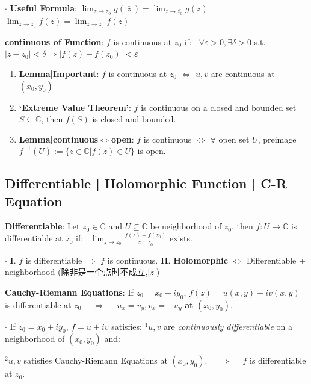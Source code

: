 \documentclass[9pt]{article}
\begin{document}
$\cdot$ \textbf{Useful Formula}: $\lim_{z\to z_0}g(\ \overline{z} \ )=\lim_{z\to\overline{z_0}}g(z)$ \qquad $\lim_{z\to z_0}\overline{f(z)}=\overline{\lim_{z\to z_0}f(z)}$

\textbf{continuous of Function}: $f$ is continuous at $z_0$ if: \ $\forall\varepsilon>0,\exists\delta>0$ s.t. $|z-z_0|<\delta\Rightarrow |f(z)-f(z_0)|<\varepsilon$ 

\begin{enumerate}[itemsep=-2pt, topsep=-2pt]
    \item \textbf{Lemma|Important}: $f$ is continuous at $z_0$ $\Leftrightarrow$ $u,v$ are continuous at $(x_0,y_0)$
    \item \textbf{`Extreme Value Theorem'}: $f$ is continuous on a closed and bounded set $S\subseteq\mathbb{C}$, then $f(S)$ is closed and bounded.
    \item \textbf{Lemma|continuous$\Leftrightarrow$open}: $f$ is continuous $\Leftrightarrow$ $\forall$ open set $U$, preimage $f^{-1}(U):=\{z\in\mathbb{C}|f(z)\in U\}$ is open.
\end{enumerate}


\subsection{Differentiable | Holomorphic Function | C-R Equation} %

\textbf{Differentiable}: Let $z_0\in\mathbb{C}$ and $U\subseteq\mathbb{C}$ be neighborhood of $z_0$, then $f:U\to\mathbb{C}$ is differentiable at $z_0$ if: \ $\lim_{z\to z_0}\frac{f(z)-f(z_0)}{z-z_0}$ exists.

$\cdot$ \textbf{I}. $f$ is differentiable $\Rightarrow$ $f$ is continuous. \quad \quad \textbf{II}. \textbf{Holomorphic} $\Leftrightarrow$ {\small Differentiable + neighborhood} {\tiny (除非是一个点时不成立,$|z|$)} 

\textbf{Cauchy-Riemann Equations}: If $z_0=x_0+iy_0$, $f(z)=u(x,y)+iv(x,y)$ is differentiable at $z_0$ \ \ $\Rightarrow$ \ \ $u_x=v_y,v_x=-u_y$ \textbf{at} $(x_0,y_0)$.

$\cdot$ If $z_0=x_0+iy_0$, $f=u+iv$ satisfies: $^1u,v$ are \textit{continuously differentiable} on a neighborhood of $(x_0,y_0)$ and:

\hspace{162pt} $^2u,v$ satisfies Cauchy-Riemann Equations at $(x_0,y_0)$. \ \ $\Rightarrow$ \ \ $f$ is differentiable at $z_0$.
\end{document}
